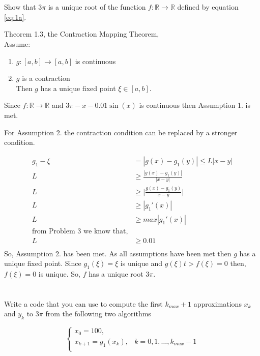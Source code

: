 \documentclass{article}
\begin{document}
\section{}
Show that $3\pi$ is a unique root of the function $f:\mathbb{R} \xrightarrow{} \mathbb{R}$ defined by equation \ref{eq:1a}.
\vspace{10mm}

Theorem 1.3, the Contraction Mapping Theorem,\\
Assume:
\begin{enumerate}
      \item $g: [a,b] \to [a,b]$ is continuous
    \item $g$ is a contraction \\
    Then $g$ has a unique fixed point $\xi \in [a,b]$.
\end{enumerate}

Since $f: \mathbb{R}\to \mathbb{R}$ and $3\pi-x-0.01 \sin(x)$ is continuous then Assumption 1. is met.\par
For Assumption 2. the contraction condition can be replaced by a stronger condition.

\begin{align*}
    g_1-\xi  &= |g(x)-g_1(y)| \le L|x-y|\\
    L &\ge \frac{|g(x)-g_1(y)|}{|x-y|}\\
    L &\ge \bigg |\frac{g(x)-g_1(y)}{x-y} \bigg| \\
    L &\ge |g_1'(x)|\\
    L &\ge max|g_1'(x)|\\
    \text{from Problem 3 we know that,}&\\
    L &\ge 0.01\\
\end{align*}
So, Assumption 2. has been met. As all assumptions have been met then $g$ has a unique fixed point. Since $g_1(\xi)=\xi$ is unique and $g(\xi)t > f(\xi)=0$ then, $f(\xi)=0$ is unique. So, $f$ has a unique root $3\pi$.

\section{}
Write a code that you can use to compute the first $k_{max}+1$ approximations $x_k$ and $y_k$ to $3\pi$ from the following two algorithms

\begin{equation}\label{eq:4a}
    \begin{cases}
    x_0 = 100,\\
    x_{k+1}= g_1(x_k), & k=0,1,\dots , k_{max}-1\\
    \end{cases}
\end{equation}
\end{document}
